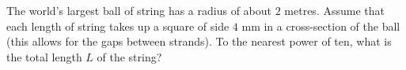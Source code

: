 The world's largest ball of string has a radius of about $2$ metres. Assume that each length of string takes up a square of side $4$ mm in a cross-section of the ball (this allows for the gaps between strands). To the nearest power of ten, what is the total length $L$ of the string?
